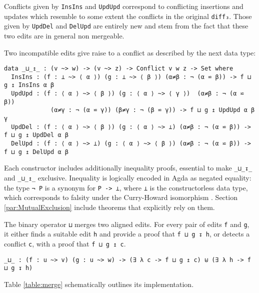 \documentclass[../Thesis.tex]{subfiles}
\begin{document}
	Conflicts given by \texttt{InsIns} and \texttt{UpdUpd}	 correspond to 
	conflicting insertions and updates which resemble to some extent the
	conflicts in the original \texttt{diff₃}. Those given by \texttt{UpdDel} and 
	\texttt{DelUpd} are entirely new and stem from the fact that these two
	edits are in general non mergeable.
	
	Two incompatible edits give raise to a conflict as described by the
	next data type:
	
\begin{verbatim}
data _⊔_↥_ : (v ~> w) -> (v ~> z) -> Conflict v w z -> Set where
  InsIns : (f : ⊥ ~> ⟨ α ⟩) (g : ⊥ ~> ⟨ β ⟩) (α≠β : ¬ (α ⋍ β)) -> f ⊔ g ↥ InsIns α β
  UpdUpd : (f : ⟨ α ⟩ ~> ⟨ β ⟩) (g : ⟨ α ⟩ ~> ⟨ γ ⟩)  (α≠β : ¬ (α ⋍ β)) 
             (α≠γ : ¬ (α ⋍ γ)) (β≠γ : ¬ (β ⋍ γ)) -> f ⊔ g ↥ UpdUpd α β γ
  UpdDel : (f : ⟨ α ⟩ ~> ⟨ β ⟩) (g : ⟨ α ⟩ ~> ⊥) (α≠β : ¬ (α ⋍ β)) -> f ⊔ g ↥ UpdDel α β
  DelUpd : (f : ⟨ α ⟩ ~> ⊥) (g : ⟨ α ⟩ ~> ⟨ β ⟩) (α≠β : ¬ (α ⋍ β)) -> f ⊔ g ↥ DelUpd α β
\end{verbatim}
	
	Each constructor includes additionally inequality proofs, essential 
	to make \texttt{\_⊔\_↧\_} and \texttt{\_⊔\_↥\_} exclusive.
	Inequality is logically encoded in Agda as negated equality: the type 
	\texttt{¬ P} is a synonym for \texttt{P -> ⊥}, where \texttt{⊥} is
	the constructorless data type, which corresponds to falsity 
	under the Curry-Howard isomorphism \cite{PropositionAsTypes}.
	Section \ref{par:MutualExclusion} include
	theorems that explicitly rely on them.

	The binary operator \texttt{⊔} merges two aligned edits.
	For every pair of edits \texttt{f} and \texttt{g}, 
	it either finds a suitable edit \texttt{h} and provide
	a proof that \texttt{f ⊔ g ↧ h}, or detects a conflict \texttt{c}, 
	with a proof that \texttt{f ⊔ g ↥ c}.

\begin{verbatim}
_⊔_ : (f : u ~> v) (g : u ~> w) -> (∃ λ c -> f ⊔ g ↥ c) ⊎ (∃ λ h -> f ⊔ g ↧ h)
\end{verbatim}

	Table \ref{table:merge} schematically outlines its implementation.
\end{document}
